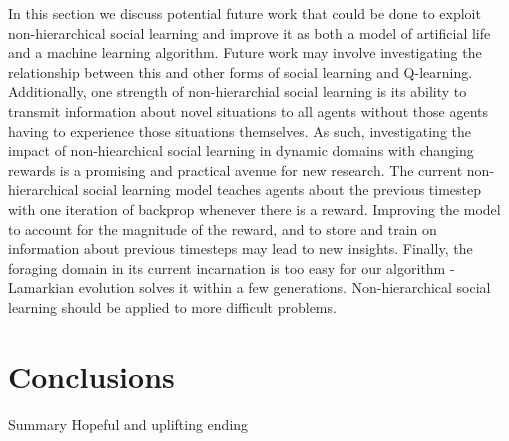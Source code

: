\documentclass{acm_proc_article-sp}
\begin{document}
In this section we discuss potential future work that could be done to exploit non-hierarchical social learning and improve it as both a model of artificial life and a machine learning algorithm. Future work may involve investigating the relationship between this and other forms of social learning and Q-learning.  Additionally, one strength of non-hierarchial social learning is its ability to transmit information about novel situations to all agents without those agents having to experience those situations themselves.  As such, investigating the impact of non-hiearchical social learning in dynamic domains with changing rewards is a promising and practical avenue for new research.  The current non-hierarchical social learning model teaches agents about the previous timestep with one iteration of backprop whenever there is a reward.  Improving the model to account for the magnitude of the reward, and to store and train on information about previous timesteps may lead to new insights.  Finally, the foraging domain in its current incarnation is too easy for our algorithm - Lamarkian evolution solves it within a few generations. Non-hierarchical social learning should be applied to more difficult problems.


\section{Conclusions}
\label{sec:conclusions}
Summary
Hopeful and uplifting ending
\end{document}
